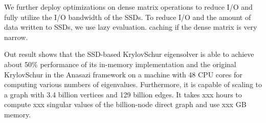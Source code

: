 We further deploy optimizations on dense matrix operations to reduce I/O and
fully utilize the I/O bandwidth of the SSDs.
To reduce I/O and the amount of data written to SSDs, we use lazy evaluation.
caching if the dense matrix is very narrow.



Out result shows that the SSD-based KrylovSchur eigensolver is able to achieve
about 50\% performance of its in-memory implementation and the original
KrylovSchur in the Anasazi framework on a machine with 48 CPU cores for
computing various numbers of eigenvalues. Furthermore, it is
capable of scaling to a graph with 3.4 billion vertices and 129 billion edges.
It takes xxx hours to compute xxx singular values of the billion-node direct graph
and use xxx GB memory.
